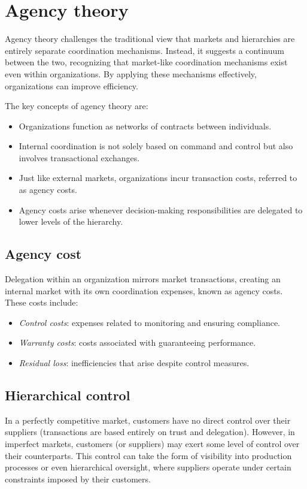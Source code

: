 \section{Agency theory}

Agency theory challenges the traditional view that markets and hierarchies are entirely separate coordination mechanisms. 
Instead, it suggests a continuum between the two, recognizing that market-like coordination mechanisms exist even within organizations. 
By applying these mechanisms effectively, organizations can improve efficiency.

The key concepts of agency theory are: 
\begin{itemize}
    \item Organizations function as networks of contracts between individuals.
    \item Internal coordination is not solely based on command and control but also involves transactional exchanges.
    \item Just like external markets, organizations incur transaction costs, referred to as agency costs.
    \item Agency costs arise whenever decision-making responsibilities are delegated to lower levels of the hierarchy.
\end{itemize}

\subsection{Agency cost}
Delegation within an organization mirrors market transactions, creating an internal market with its own coordination expenses, known as agency costs. 
These costs include:
\begin{itemize}
    \item \textit{Control costs}: expenses related to monitoring and ensuring compliance.
    \item \textit{Warranty costs}: costs associated with guaranteeing performance.
    \item \textit{Residual loss}: inefficiencies that arise despite control measures.
\end{itemize}

\subsection{Hierarchical control}
In a perfectly competitive market, customers have no direct control over their suppliers (transactions are based entirely on trust and delegation). 
However, in imperfect markets, customers (or suppliers) may exert some level of control over their counterparts. 
This control can take the form of visibility into production processes or even hierarchical oversight, where suppliers operate under certain constraints imposed by their customers.

